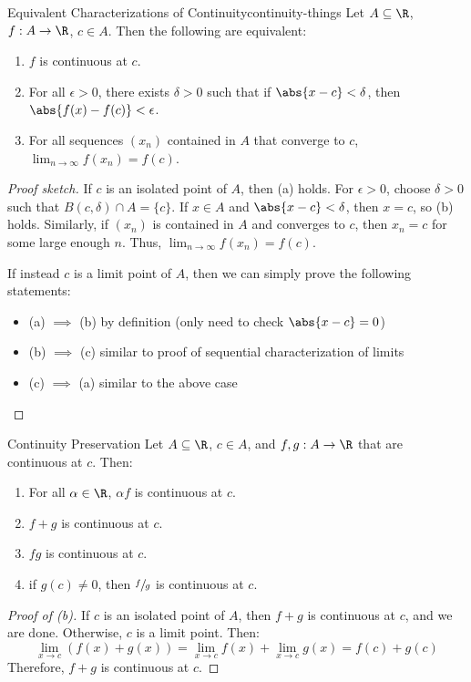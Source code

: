 \begin{thmbox}{Equivalent Characterizations of Continuity}{continuity-things}
    Let $A \subseteq \R$, $f : A \to \R$, $c \in A$. Then the following are equivalent:
    \begin{enumerate}[label=(\alph*)]
        \item $f$ is continuous at $c$.
        \item For all $\epsilon > 0$, there exists $\delta > 0$ such that if $\abs{x-c} < \delta$, then $\abs{f(x) - f(c)} < \epsilon$.
        \item For all sequences $(x_n)$ contained in $A$ that converge to $c$, $\lim_{n\to\infty} f(x_n) = f(c)$.
    \end{enumerate}
    \tcblower
    \begin{proof}[Proof sketch]
        If $c$ is an isolated point of $A$, then (a) holds. For $\epsilon > 0$, choose $\delta > 0$ such that $B(c, \delta) \cap A = \{c\}$. If $x \in A$ and $\abs{x-c} < \delta$, then $x = c$, so (b) holds. Similarly, if $(x_n)$ is contained in $A$ and converges to $c$, then $x_n = c$ for some large enough $n$. Thus, $\lim_{n\to\infty} f(x_n) = f(c)$.

        If instead $c$ is a limit point of $A$, then we can simply prove the following statements:
        \begin{itemize}
            \item (a) $\implies$ (b) by definition (only need to check $\abs{x-c} = 0$)
            \item (b) $\implies$ (c) similar to proof of sequential characterization of limits
            \item (c) $\implies$ (a) similar to the above case
        \end{itemize}
    \end{proof}
\end{thmbox}

\begin{thmbox}{Continuity Preservation}{}
    Let $A \subseteq \R$, $c \in A$, and $f,g : A \to \R$ that are continuous at $c$. Then:
    \begin{enumerate}[label=(\alph*)]
        \item For all $\alpha \in \R$, $\alpha f$ is continuous at $c$.
        \item $f + g$ is continuous at $c$.
        \item $fg$ is continuous at $c$.
        \item if $g(c) \neq 0$, then $\sfrac{f}{g}$ is continuous at $c$.
    \end{enumerate}
    \tcblower
    \begin{proof}[Proof of (b)]
        If $c$ is an isolated point of $A$, then $f+g$ is continuous at $c$, and we are done. Otherwise, $c$ is a limit point. Then:
        \[ \lim_{x \to c} (f(x) + g(x)) = \lim_{x \to c} f(x) + \lim_{x \to c} g(x) = f(c) + g(c) \]
        Therefore, $f+g$ is continuous at $c$.
    \end{proof}
\end{thmbox}

